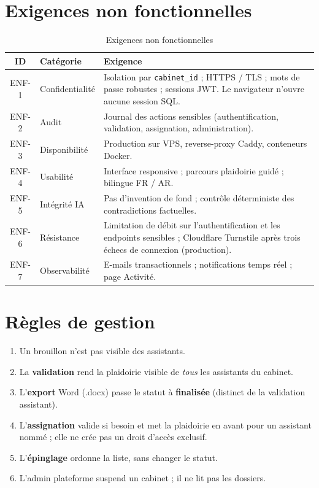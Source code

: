\section{Exigences non fonctionnelles}

\begin{table}[H]
\centering
\caption{Exigences non fonctionnelles}
\label{tab:enf}
\small
\renewcommand{\arraystretch}{1.2}
\begin{tabular}{@{}clp{9.8cm}@{}}
\toprule
\textbf{ID} & \textbf{Catégorie} & \textbf{Exigence} \\
\midrule
ENF-1 & Confidentialité & Isolation par \texttt{cabinet\_id} ; HTTPS / TLS ; mots de passe robustes ; sessions JWT. Le navigateur n'ouvre aucune session SQL. \\
ENF-2 & Audit & Journal des actions sensibles (authentification, validation, assignation, administration). \\
ENF-3 & Disponibilité & Production sur VPS, reverse-proxy Caddy, conteneurs Docker. \\
ENF-4 & Usabilité & Interface responsive ; parcours plaidoirie guidé ; bilingue FR / AR. \\
ENF-5 & Intégrité IA & Pas d'invention de fond ; contrôle déterministe des contradictions factuelles. \\
ENF-6 & Résistance & Limitation de débit sur l'authentification et les endpoints sensibles ; Cloudflare Turnstile après trois échecs de connexion (production). \\
ENF-7 & Observabilité & E-mails transactionnels ; notifications temps réel ; page Activité. \\
\bottomrule
\end{tabular}
\end{table}

\section{Règles de gestion}

\begin{enumerate}[leftmargin=1.4em]
  \item Un brouillon n'est pas visible des assistants.
  \item La \textbf{validation} rend la plaidoirie visible de \emph{tous} les assistants du cabinet.
  \item L'\textbf{export} Word (.docx) passe le statut à \textbf{finalisée} (distinct de la validation assistant).
  \item L'\textbf{assignation} valide si besoin et met la plaidoirie en avant pour un assistant nommé ; elle ne crée pas un droit d'accès exclusif.
  \item L'\textbf{épinglage} ordonne la liste, sans changer le statut.
  \item L'admin plateforme suspend un cabinet ; il ne lit pas les dossiers.
\end{enumerate}

